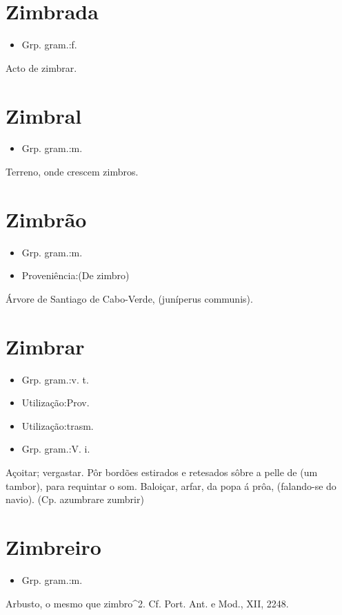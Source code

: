 \section{Zimbrada}
\begin{itemize}
\item {Grp. gram.:f.}
\end{itemize}
Acto de zimbrar.
\section{Zimbral}
\begin{itemize}
\item {Grp. gram.:m.}
\end{itemize}
Terreno, onde crescem zimbros.
\section{Zimbrão}
\begin{itemize}
\item {Grp. gram.:m.}
\end{itemize}
\begin{itemize}
\item {Proveniência:(De \textunderscore zimbro\textunderscore )}
\end{itemize}
Árvore de Santiago de Cabo-Verde, (\textunderscore juníperus communis\textunderscore ).
\section{Zimbrar}
\begin{itemize}
\item {Grp. gram.:v. t.}
\end{itemize}
\begin{itemize}
\item {Utilização:Prov.}
\end{itemize}
\begin{itemize}
\item {Utilização:trasm.}
\end{itemize}
\begin{itemize}
\item {Grp. gram.:V. i.}
\end{itemize}
Açoitar; vergastar.
Pôr bordões estirados e retesados sôbre a pelle de (um tambor), para requintar o som.
Baloiçar, arfar, da popa á prôa, (falando-se do navio).
(Cp. \textunderscore azumbrar\textunderscore  e \textunderscore zumbrir\textunderscore )
\section{Zimbreiro}
\begin{itemize}
\item {Grp. gram.:m.}
\end{itemize}
Arbusto, o mesmo que \textunderscore zimbro\textunderscore ^2. Cf. \textunderscore Port. Ant. e Mod.\textunderscore , XII, 2248.
